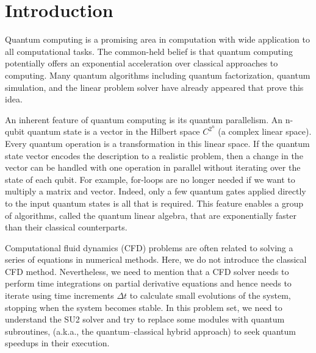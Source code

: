 \documentclass[%
 reprint,
 amsmath,amssymb,
pra,
]{revtex4-1}
\begin{document}


\section{Introduction}
Quantum computing is a promising area in computation with wide application to all computational tasks. The common-held belief is that quantum computing potentially offers an exponential acceleration over classical approaches to computing. Many quantum algorithms including quantum factorization\cite{shor1999polynomial, xu2012quantum}, quantum simulation\cite{georgescu2014quantum, Berry2014Proceedings, berry2015hamiltonian, o2016scalable}, and the linear problem solver \cite{PhysRevLett.103.150502, ambainis2010variable, Childs2017Quantum} have already appeared that prove this idea. 

An inherent feature of quantum computing is its quantum parallelism. An n-qubit quantum state is a vector in the Hilbert space $C^{2^n}$ (a complex linear space). Every quantum operation is a transformation in this linear space. If the quantum state vector encodes the description to a realistic problem, then a change in the vector can be handled with one operation in parallel without iterating over the state of each qubit. For example, for-loops are no longer needed if we want to multiply a matrix and vector. Indeed, only a few quantum gates applied directly to the input quantum states is all that is required. This feature enables a group of algorithms, called the quantum linear algebra, that are exponentially faster than their classical counterparts.

Computational fluid dynamics (CFD) problems are often related to solving a series of equations in numerical methods\cite{jameson1981numerical, ferziger2002computational, hirsch2007numerical, cambier2013onera}. Here, we do not introduce the classical CFD method. Nevertheless, we need to mention that a CFD solver needs to perform time integrations on partial derivative equations and hence needs to iterate using time increments $\Delta t$ to calculate small evolutions of the system, stopping when the system becomes stable. In this problem set, we need to understand the SU2 solver \cite{economon2016su2} and try to replace some modules with quantum subroutines, (a.k.a., the quantum--classical hybrid approach) to seek quantum speedups in their execution.
\end{document}
